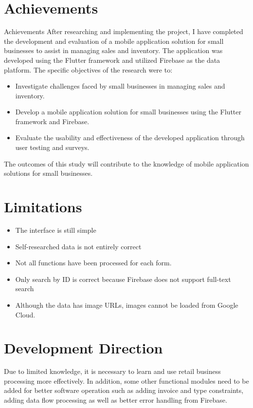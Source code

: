 \section*{Achievements} Achievements
After researching and implementing the project, I have completed the development and evaluation of a mobile application solution for small businesses to assist in managing sales and inventory. The application was developed using the Flutter framework and utilized Firebase as the data platform. The specific objectives of the research were to:
\begin{itemize}
    \item Investigate challenges faced by small businesses in managing sales and inventory.
    \item Develop a mobile application solution for small businesses using the Flutter framework and Firebase.
    \item Evaluate the usability and effectiveness of the developed application through user testing and surveys.
\end{itemize}

The outcomes of this study will contribute to the knowledge of mobile application solutions for small businesses.

\section*{Limitations}
\begin{itemize}
    \item The interface is still simple
    \item Self-researched data is not entirely correct
    \item Not all functions have been processed for each form.
    \item Only search by ID is correct because Firebase does not support full-text search
    \item Although the data has image URLs, images cannot be loaded from Google Cloud.
\end{itemize}

\section*{Development Direction} 
Due to limited knowledge, it is necessary to learn and use retail business processing more effectively. In addition, some other functional modules need to be added for better software operation such as adding invoice and type constraints, adding data flow processing as well as better error handling from Firebase.